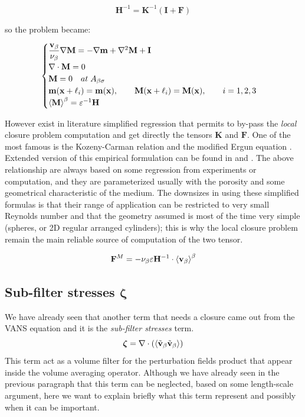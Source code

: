 $$
\mathbf{H}^{-1} = \mathbf{K}^{-1} \left(\mathbf{I} +\mathbf{F}\right)
$$

so the problem became:

\begin{eqnarray}
	\begin{cases}
		\dfrac{\textbf{v}_{\beta}}{\nu_{\beta}} \nabla \mathbf{M} = -\nabla \mathbf{m} + \nabla^2 \mathbf{M} +\mathbf{I}\\
		\nabla \cdot \mathbf{M} = 0  \\
		\mathbf{M} = 0 \quad at \; A_{\beta \sigma} \\
		\mathbf{m}(\mathbf{x} +\ell_i) = \mathbf{m}(\mathbf{x}), \qquad \mathbf{M}(\mathbf{x} +\ell_i) = \mathbf{M}(\mathbf{x}), \qquad i=1,2,3 \\
		{\left< \mathbf{M} \right>}^{\beta} = \varepsilon^{-1} \mathbf{H}
	\end{cases}
\label{eq:M_problem}
\end{eqnarray}

However exist in literature simplified regression that permits to by-pass the \textit{local} closure problem computation and get directly the tensors $\mathbf{K}$ and $\mathbf{F}$.
One of the most famous is the Kozeny-Carman relation \citet{kozeny} and the modified Ergun equation \cite{transport2002bird}.
Extended version of this empirical formulation can be found in \citet{zampogna2016fluid} and \cite{yazdchi2012towards}.
The above relationship are always based on some regression from experiments or computation, and they are parameterized usually with the porosity and some geometrical characteristic of the medium.
The downsizes in using these simplified formulas is that their range of application can be restricted to very small Reynolds number and that the geometry assumed is most of the time very simple (spheres, or 2D regular arranged cylinders); this is why the local closure problem remain the main reliable source of computation of the two tensor.

$$\mathbf{F}^M = - \nu_{\beta} \varepsilon \mathbf{H}^{-1} \cdot {\left< \textbf{v}_{\beta}\right>}^{\beta}$$


\subsection{Sub-filter stresses $\boldsymbol{\zeta}$}

We have already seen that another term that needs a closure came out from the VANS equation and it is the \textit{sub-filter stresses} term.
$$\boldsymbol{\zeta} = \nabla \cdot \left({\left< \tilde{\textbf{v}}_{\beta} \tilde{\textbf{v}}_{\beta} \right>}\right)$$
This term act as a volume filter for the perturbation fields product that appear inside the volume averaging operator.
Although we have already seen in the previous paragraph that this term can be neglected, based on some length-scale argument, here we want to explain briefly what this term represent and possibly when it can be important.

